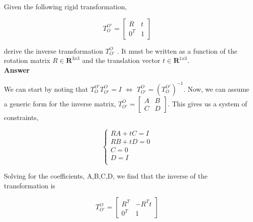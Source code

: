 \documentclass[12pt, letterpaper]{article}
\begin{document}

\vspace{1.5cm}
 \hspace{0.4cm} Given the following rigid transformation,

$$ 
T_{O}^{O'} = 
\begin{bmatrix} 
R & t \\
0^{T} & 1 
\end{bmatrix}
$$

\indent derive the inverse transformation $T_{O'}^{O}$ . It must be written as a function of the rotation matrix $R \in \mathbf{R}^{3x3}$ and the translation vector $t \in \mathbf{R}^{1x3}$. \\

{\bf{ Answer \\}}

\indent We can start by noting that $ T^{O'}_{O} T^{O}_{O'} = I $ $ \iff $ $ T^{O}_{O'} = (T^{O'}_{O} )^{-1} $. Now, we can assume a generic form for the inverse matrix, $T_{O'}^{O} = \begin{bmatrix}  A & B \\ C & D  \end{bmatrix}$. This gives us a system of constraints, 

\[
	\left\{
           \begin{array}{ll}
                  RA +tC = I\\
                  RB + tD = 0\\
                  C = 0 \\ 
                  D = I \\ 
                \end{array}
              \right.
  \]

\indent Solving for the coefficients, A,B,C,D, we find that the inverse of the transformation is

$$ T_{O'}^{O} = 
\begin{bmatrix} 
R^{T} & -R^{T}t \\
0^{T} & 1 
\end{bmatrix}
$$


\end{document}
